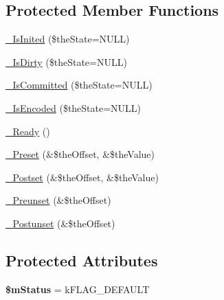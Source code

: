 \subsection*{Protected Member Functions}
\begin{DoxyCompactItemize}
\item 
\hyperlink{class_c_status_document_a954dee06e219e0a0f2e7fa6edac56e28}{\-\_\-\-Is\-Inited} (\$the\-State=N\-U\-L\-L)
\item 
\hyperlink{class_c_status_document_ad5193995e1bff6de09acf3248a232ef9}{\-\_\-\-Is\-Dirty} (\$the\-State=N\-U\-L\-L)
\item 
\hyperlink{class_c_status_document_ab7d96fd4588cf7d5432fc65a1d1fb076}{\-\_\-\-Is\-Committed} (\$the\-State=N\-U\-L\-L)
\item 
\hyperlink{class_c_status_document_a86074a4afbabd35729c10aa4a1d31a82}{\-\_\-\-Is\-Encoded} (\$the\-State=N\-U\-L\-L)
\item 
\hyperlink{class_c_status_document_aceabdbc06743c524cf3c60d20b7f1fd7}{\-\_\-\-Ready} ()
\item 
\hyperlink{class_c_status_document_a51cac708e56c6c258f05c7458588ca47}{\-\_\-\-Preset} (\&\$the\-Offset, \&\$the\-Value)
\item 
\hyperlink{class_c_status_document_aa1d190aacd1573a699b572aae251e479}{\-\_\-\-Postset} (\&\$the\-Offset, \&\$the\-Value)
\item 
\hyperlink{class_c_status_document_a9507e9159eb7fc1b2a0965d1fd267fa8}{\-\_\-\-Preunset} (\&\$the\-Offset)
\item 
\hyperlink{class_c_status_document_a0022e449834b628db7f5f75698adb57d}{\-\_\-\-Postunset} (\&\$the\-Offset)
\end{DoxyCompactItemize}
\subsection*{Protected Attributes}
\begin{DoxyCompactItemize}
\item 
\hypertarget{class_c_status_document_a629582fbcf551372e99b06d79e78c9f1}{{\bfseries \$m\-Status} = k\-F\-L\-A\-G\-\_\-\-D\-E\-F\-A\-U\-L\-T}\label{class_c_status_document_a629582fbcf551372e99b06d79e78c9f1}

\end{DoxyCompactItemize}


